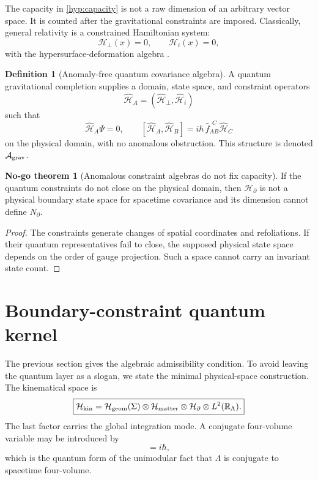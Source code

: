 \documentclass[aps,prd,reprint,nofootinbib,superscriptaddress]{revtex4-2}
\numberwithin{equation}{section}
\theoremstyle{definition}
\newtheorem{definition}{Definition}[section]
\newtheorem{nogotheorem}{No-go theorem}[section]
\theoremstyle{plain}
\newcommand{\R}{\mathbb R}
\newcommand{\Agrav}{\mathcal A_{\rm grav}}
\newcommand{\Ncap}{N_{\partial}}
\newcommand{\Hkin}{\mathcal H_{\rm kin}}
\newcommand{\Hbd}{\mathcal H_{\partial}}
\newcommand{\Tfour}{\mathcal T_4}
\begin{document}
The capacity in \cref{hyp:capacity} is not a raw dimension of an arbitrary vector space.  It is counted after the gravitational constraints are imposed.  Classically, general relativity is a constrained Hamiltonian system:
\begin{equation}
\mathcal H_\perp(x)=0,
\qquad
\mathcal H_i(x)=0,
\end{equation}
with the hypersurface-deformation algebra \cite{Dirac1958,ADM1962,HenneauxTeitelboim1992,Dirac1964}.

\begin{definition}[Anomaly-free quantum covariance algebra]\label{def:agrav}
A quantum gravitational completion supplies a domain, state space, and constraint operators
\begin{equation}
\widehat{\mathcal H}_A=(\widehat{\mathcal H}_\perp,\widehat{\mathcal H}_i)
\end{equation}
such that
\begin{equation}
\boxed{
\widehat{\mathcal H}_A\Psi=0,
\qquad
[\widehat{\mathcal H}_A,\widehat{\mathcal H}_B]
=
i\hbar\,\widehat f_{AB}^{\ \ C}\widehat{\mathcal H}_C
}
\end{equation}
on the physical domain, with no anomalous obstruction.  This structure is denoted \(\Agrav\).
\end{definition}

\begin{nogotheorem}[Anomalous constraint algebras do not fix capacity]\label{nogo:anomaly}
If the quantum constraints do not close on the physical domain, then \(\mathcal H_\partial\) is not a physical boundary state space for spacetime covariance and its dimension cannot define \(\Ncap\).
\end{nogotheorem}

\begin{proof}
The constraints generate changes of spatial coordinates and refoliations.  If their quantum representatives fail to close, the supposed physical state space depends on the order of gauge projection.  Such a space cannot carry an invariant state count.
\end{proof}


\section{Boundary-constraint quantum kernel}\label{sec:quantum-kernel}

The previous section gives the algebraic admissibility condition.  To avoid leaving the quantum layer as a slogan, we state the minimal physical-space construction.  The kinematical space is
\begin{equation}
\boxed{
\Hkin=
\mathcal H_{\rm geom}(\Sigma)
\otimes
\mathcal H_{\rm matter}
\otimes
\Hbd
\otimes
L^2(\R_\Lambda).
}
\end{equation}
The last factor carries the global integration mode.  A conjugate four-volume variable may be introduced by
\begin{equation}
[\widehat{\Tfour},\widehat\Lambda]=i\hbar,
\end{equation}
which is the quantum form of the unimodular fact that \(\Lambda\) is conjugate to spacetime four-volume.
\end{document}
